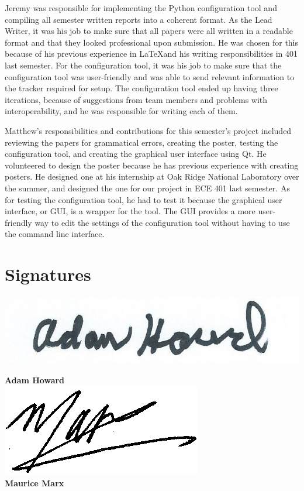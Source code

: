 \documentclass[12 pt]{article}
\begin{document}
	Jeremy was responsible for implementing the Python configuration tool and compiling all semester written reports into a coherent format. As the Lead Writer, it was his job to make sure that all papers were all written in a readable format and that they looked professional upon submission. He was chosen for this because of his previous experience in \LaTeX and his writing responsibilities in 401 last semester. For the configuration tool, it was his job to make sure that the configuration tool was user-friendly and was able to send relevant information to the tracker required for setup. The configuration tool ended up having three iterations, because of suggestions from team members and problems with interoperability, and he was responsible for writing each of them.
	
	Matthew's responsibilities and contributions for this semester's project included reviewing the papers for grammatical errors, creating the poster, testing the configuration tool, and creating the graphical user interface using Qt. He volunteered to design the poster because he has previous experience with creating posters. He designed one at his internship at Oak Ridge National Laboratory over the summer, and designed the one for our project in ECE 401 last semester. As for testing the configuration tool, he had to test it because the graphical user interface, or GUI, is a wrapper for the tool. The GUI provides a more user-friendly way to edit the settings of the configuration tool without having to use the command line interface.
	\section{Signatures}
	
	\includegraphics[width=0.3\linewidth]{Adamsig}
	
	\textbf{Adam Howard} \hfill\\
	
	\includegraphics[width=0.3\linewidth]{Mauricesig} \\
	
	\textbf{Maurice Marx} \\
	
\end{document}
